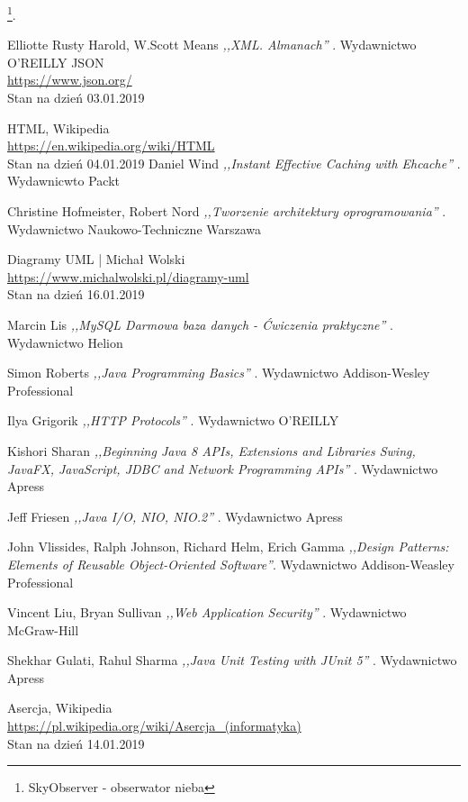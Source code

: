 \documentclass[12pt, twoside]{report}
\begin{document}
\footnote{SkyObserver - obserwator nieba}. 

\begin{thebibliography}{9}
Elliotte Rusty Harold, W.Scott Means \emph{ ,,XML. Almanach'' }. Wydawnictwo O'REILLY
  JSON \\
  \url{https://www.json.org/} \\
  Stan na dzień 03.01.2019

    HTML, Wikipedia \\
	\url{https://en.wikipedia.org/wiki/HTML} \\
	Stan na dzień 04.01.2019
Daniel Wind \emph{ ,,Instant Effective Caching with Ehcache'' }. Wydawnicwto Packt

Christine Hofmeister, Robert Nord \emph{ ,,Tworzenie architektury oprogramowania'' }. Wydawnictwo Naukowo-Techniczne Warszawa

	Diagramy UML | Michał Wolski\\ \url{https://www.michalwolski.pl/diagramy-uml} \\
	Stan na dzień 16.01.2019
	
Marcin Lis \emph{ ,,MySQL Darmowa baza danych - Ćwiczenia praktyczne'' }. Wydawnictwo Helion


Simon Roberts \emph{ ,,Java Programming Basics'' }. Wydawnictwo Addison-Wesley Professional

Ilya Grigorik \emph{ ,,HTTP Protocols'' }. Wydawnictwo O'REILLY

Kishori Sharan \emph{ ,,Beginning Java 8 APIs, Extensions and Libraries Swing, JavaFX, JavaScript, JDBC and Network Programming APIs'' }. Wydawnictwo Apress
 
Jeff Friesen \emph{ ,,Java I/O, NIO, NIO.2'' }. Wydawnictwo Apress

John Vlissides, Ralph Johnson, Richard Helm, Erich Gamma \emph{ ,,Design Patterns: Elements of Reusable Object-Oriented Software''}. Wydawnictwo Addison-Weasley Professional

Vincent Liu, Bryan Sullivan \emph{ ,,Web Application Security'' }. Wydawnictwo McGraw-Hill

Shekhar Gulati, Rahul Sharma \emph{ ,,Java Unit Testing with JUnit 5'' }. Wydawnictwo Apress

Asercja, Wikipedia \\
\url{https://pl.wikipedia.org/wiki/Asercja_(informatyka)} \\
Stan na dzień 14.01.2019

\end{thebibliography}
\end{document}
